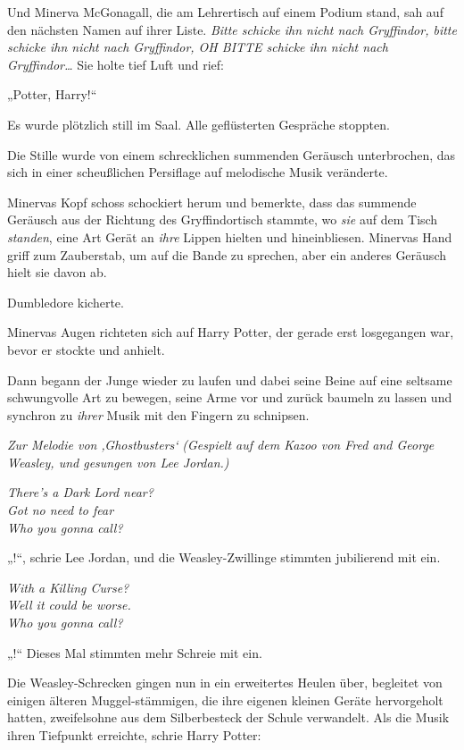Und Minerva McGonagall, die am Lehrertisch auf einem Podium stand, sah auf den nächsten Namen auf ihrer Liste. \emph{Bitte schicke ihn nicht nach Gryffindor, bitte schicke ihn nicht nach Gryffindor, OH BITTE schicke ihn nicht nach Gryffindor…} Sie holte tief Luft und rief:

„Potter, Harry!“

Es wurde plötzlich still im Saal. Alle geflüsterten Gespräche stoppten.

Die Stille wurde von einem schrecklichen summenden Geräusch unterbrochen, das sich in einer scheußlichen Persiflage auf melodische Musik veränderte.

Minervas Kopf schoss schockiert herum und bemerkte, dass das summende Geräusch aus der Richtung des Gryffindortisch stammte, wo \emph{sie} auf dem Tisch \emph{standen}, eine Art Gerät an \emph{ihre} Lippen hielten und hineinbliesen. Minervas Hand griff zum Zauberstab, um  auf die Bande zu sprechen, aber ein anderes Geräusch hielt sie davon ab.

Dumbledore kicherte.

Minervas Augen richteten sich auf Harry Potter, der gerade erst losgegangen war, bevor er stockte und anhielt.

Dann begann der Junge wieder zu laufen und dabei seine Beine auf eine seltsame schwungvolle Art zu bewegen, seine Arme vor und zurück baumeln zu lassen und synchron zu \emph{ihrer} Musik mit den Fingern zu schnipsen.

\begin{center}
\emph{Zur Melodie von ‚Ghostbusters‘}
\emph{(Gespielt auf dem Kazoo von Fred and George Weasley, und gesungen von Lee Jordan.)}

\emph{There’s a Dark Lord near?\\
Got no need to fear\\
Who you gonna call?}
\end{center}

„!“, schrie Lee Jordan, und die Weasley-Zwillinge stimmten jubilierend mit ein.

\begin{center}
\emph{With a Killing Curse?\\
Well it could be worse.\\
Who you gonna call?}
\end{center}

„!“ Dieses Mal stimmten mehr Schreie mit ein.

Die Weasley-Schrecken gingen nun in ein erweitertes Heulen über, begleitet von einigen älteren Muggel-stämmigen, die ihre eigenen kleinen Geräte hervorgeholt hatten, zweifelsohne aus dem Silberbesteck der Schule verwandelt. Als die Musik ihren Tiefpunkt erreichte, schrie Harry Potter:

